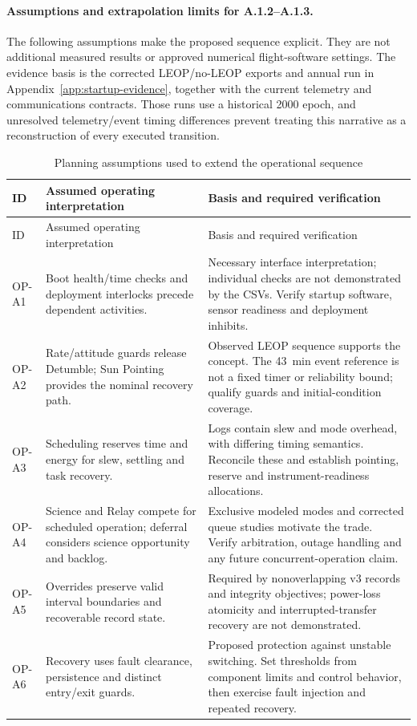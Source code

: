 \paragraph{Assumptions and extrapolation limits for A.1.2--A.1.3.}
The following assumptions make the proposed sequence explicit. They are not additional measured results or approved numerical flight-software settings. The evidence basis is the corrected LEOP/no-LEOP exports and annual run in Appendix~\ref{app:startup-evidence}, together with the current telemetry and communications contracts. Those runs use a historical 2000 epoch, and unresolved telemetry/event timing differences prevent treating this narrative as a reconstruction of every executed transition.
\begin{longtable}{@{}p{1.1cm}p{5.0cm}p{5.6cm}@{}}
\caption{Planning assumptions used to extend the operational sequence}\label{tab:op-sequence-assumptions}\\\toprule
ID & Assumed operating interpretation & Basis and required verification\\\midrule\endfirsthead
\toprule ID & Assumed operating interpretation & Basis and required verification\\\midrule\endhead
OP-A1 & Boot health/time checks and deployment interlocks precede dependent activities. & Necessary interface interpretation; individual checks are not demonstrated by the CSVs. Verify startup software, sensor readiness and deployment inhibits.\\
OP-A2 & Rate/attitude guards release Detumble; Sun Pointing provides the nominal recovery path. & Observed LEOP sequence supports the concept. The 43~min event reference is not a fixed timer or reliability bound; qualify guards and initial-condition coverage.\\
OP-A3 & Scheduling reserves time and energy for slew, settling and task recovery. & Logs contain slew and mode overhead, with differing timing semantics. Reconcile these and establish pointing, reserve and instrument-readiness allocations.\\
OP-A4 & Science and Relay compete for scheduled operation; deferral considers science opportunity and backlog. & Exclusive modeled modes and corrected queue studies motivate the trade. Verify arbitration, outage handling and any future concurrent-operation claim.\\
OP-A5 & Overrides preserve valid interval boundaries and recoverable record state. & Required by nonoverlapping v3 records and integrity objectives; power-loss atomicity and interrupted-transfer recovery are not demonstrated.\\
OP-A6 & Recovery uses fault clearance, persistence and distinct entry/exit guards. & Proposed protection against unstable switching. Set thresholds from component limits and control behavior, then exercise fault injection and repeated recovery.\\\bottomrule
\end{longtable}
